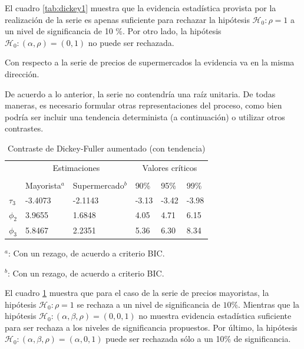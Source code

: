 \documentclass[12pt, twoside]{book}\usepackage[]{graphicx}\usepackage[]{color}
\numberwithin{equation}{section}
\numberwithin{theorem}{section}
\numberwithin{teorema}{section}
\numberwithin{defi}{section}
\numberwithin{prop}{section}
\numberwithin{defi}{section}
\theoremstyle{plain}
\begin{document}
El cuadro \ref{tab:dickey1} muestra que la evidencia estadística provista por la realización de la serie es apenas suficiente para rechazar la hipótesis $\mathcal{H}_{0}: \rho = 1$ a un nivel de significancia de 10 \%. Por otro lado, la hipótesis $\mathcal{H}_{0}: (\alpha,\rho) = (0,1) $ no puede ser rechazada.

Con respecto a la serie de precios de supermercados la evidencia va en la misma dirección. 

De acuerdo a lo anterior, la serie no contendría una raíz unitaria. De todas maneras, es necesario formular otras representaciones del proceso, como bien podría ser incluir una tendencia determinista (a continuación) o utilizar otros contrastes. 

\begin{table}[!htpb]
\centering
\begin{threeparttable}
\caption{Contraste de Dickey-Fuller aumentado (con tendencia)\label{tab:dickey2}}
\begin{tabular}{@{}llllll@{}}
\toprule
\multicolumn{1}{l}{} & \multicolumn{2}{c}{Estimaciones} &
\multicolumn{3}{c}{Valores críticos} \\
\cmidrule(l){2-3} \cmidrule(l){4-6} \\
\multicolumn{1}{l}{} & \multicolumn{1}{c}{Mayorista$^{a}$} &
 \multicolumn{1}{c}{Supermercado$^{b}$} &
\multicolumn{1}{l}{90\%}&
\multicolumn{1}{l}{95\%}&
\multicolumn{1}{l}{99\%}
\\
\midrule
$\tau_{3} $  & -3.4073 &  -2.1143  &  -3.13 & -3.42  &  -3.98 \\
$\phi_{2} $  & 3.9655  &  1.6848   &  4.05 &  4.71 &  6.15 \\
$\phi_{3} $  & 5.8467  &  2.2351   &  5.36 &  6.30 &  8.34 \\
\bottomrule
\end{tabular}
\begin{tablenotes}
\small 
\item $^{a}$: Con un rezago, de acuerdo a criterio BIC. 
\item $^{b}$: Con un rezago, de acuerdo a criterio BIC. 
\end{tablenotes}
\end{threeparttable}
\end{table}


El cuadro \ref{tab:dickey2} muestra que para el caso de la serie de precios mayoristas, la hipótesis $\mathcal{H}_{0}: \rho=1$ se rechaza a un nivel de significancia de $10\%$. Mientras que la hipótesis $\mathcal{H}_{0}: (\alpha, \beta, \rho)=(0,0,1)$  no muestra evidencia estadística suficiente para ser rechaza a los niveles de significancia propuestos. Por último, la hipótesis $\mathcal{H}_{0}: (\alpha, \beta,\rho)=(\alpha,0,1)$ puede ser rechazada sólo a un 10\% de significancia. 
\end{document}
